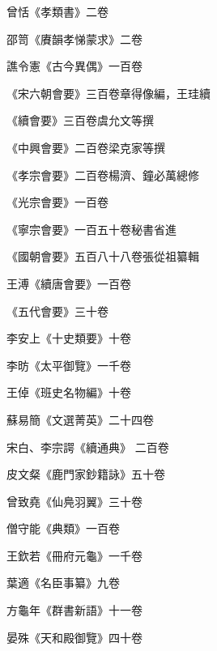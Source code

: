 \begin{pinyinscope}
 曾恬《孝類書》二卷



 邵笥《賡韻孝悌蒙求》二卷



 譙令憲《古今異偶》一百卷



 《宋六朝會要》三百卷章得像編，王珪續



 《續會要》三百卷虞允文等撰



 《中興會要》二百卷梁克家等撰



 《孝宗會要》二百卷楊濟、鐘必萬總修



 《光宗會要》一百卷



 《寧宗會要》一百五十卷秘書省進



 《國朝會要》五百八十八卷張從祖纂輯



 王溥《續唐會要》一百卷



 《五代會要》三十卷



 李安上《十史類要》十卷



 李昉《太平御覽》一千卷



 王倬《班史名物編》十卷



 蘇易簡《文選菁英》二十四卷



 宋白、李宗諤《續通典》
 二百卷



 皮文粲《鹿門家鈔籍詠》五十卷



 曾致堯《仙鳧羽翼》三十卷



 僧守能《典類》一百卷



 王欽若《冊府元龜》一千卷



 葉適《名臣事纂》九卷



 方龜年《群書新語》十一卷



 晏殊《天和殿御覽》四十卷




\end{pinyinscope}
